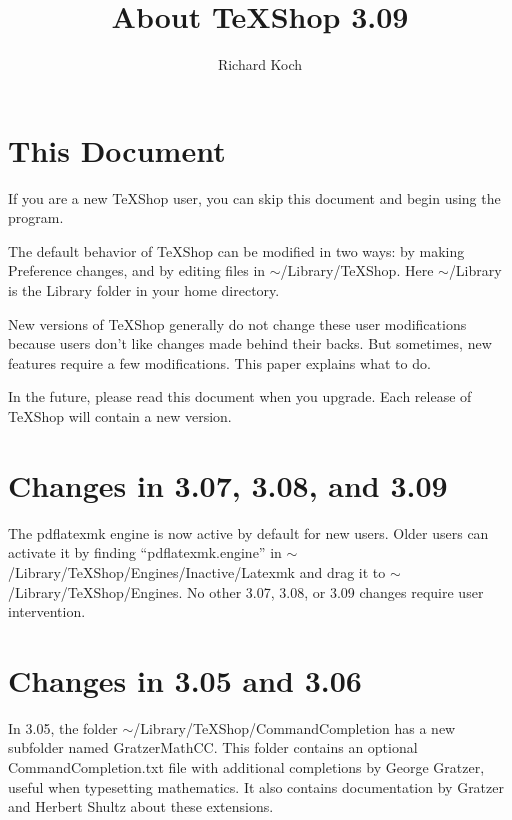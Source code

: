 \documentclass[11pt, oneside]{amsart}
\title{About TeXShop 3.09}
\author{Richard Koch}
\begin{document}
\maketitle

\thispagestyle{empty}
\vspace{-.3in}
\section{This Document}

If you are a new TeXShop user, you can skip this document and begin using the program.

The default behavior of TeXShop can be modified in two ways: by making Preference changes, and by editing files in $\sim$/Library/TeXShop. Here $\sim$/Library is the Library folder in your home directory. 

New versions of TeXShop generally do not change these user modifications because users don't like changes made behind their backs. But sometimes, new features require a few modifications. This paper explains what to do.

In the future, please read this document when you upgrade. Each release of TeXShop will contain a new version. 

\section{Changes in 3.07, 3.08, and 3.09}

The pdflatexmk engine is now active by default for new users. Older users can activate it by finding ``pdflatexmk.engine'' in $\sim$/Library/TeXShop/Engines/Inactive/Latexmk
and drag it to $\sim$/Library/TeXShop/Engines. No other 3.07, 3.08, or 3.09 changes require user intervention.

\section{Changes in 3.05 and 3.06}

In 3.05, the folder $\sim$/Library/TeXShop/CommandCompletion  has a new subfolder named GratzerMathCC. This folder contains
an optional CommandCompletion.txt file with additional completions by George Gratzer, useful when typesetting mathematics.
It also contains documentation by Gratzer and Herbert Shultz about these extensions.
\end{document}
